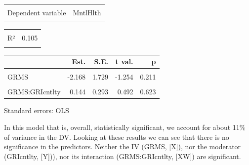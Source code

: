 \documentclass[
  english,
]{book}
\begin{document}
\begin{table}[!h]
\centering
\begin{tabular}{lr}
\toprule
\cellcolor{gray!6}{Observations} & \cellcolor{gray!6}{212}\\
Dependent variable & MntlHlth\\
\cellcolor{gray!6}{Type} & \cellcolor{gray!6}{OLS linear regression}\\
\bottomrule
\end{tabular}
\end{table} \begin{table}[!h]
\centering
\begin{tabular}{lr}
\toprule
\cellcolor{gray!6}{F(3,208)} & \cellcolor{gray!6}{8.137}\\
R² & 0.105\\
\cellcolor{gray!6}{Adj. R²} & \cellcolor{gray!6}{0.092}\\
\bottomrule
\end{tabular}
\end{table} \begin{table}[!h]
\centering
\begin{threeparttable}
\begin{tabular}{lrrrr}
\toprule
  & Est. & S.E. & t val. & p\\
\midrule
\cellcolor{gray!6}{(Intercept)} & \cellcolor{gray!6}{26.647} & \cellcolor{gray!6}{3.877} & \cellcolor{gray!6}{6.873} & \cellcolor{gray!6}{0.000}\\
GRMS & -2.168 & 1.729 & -1.254 & 0.211\\
\cellcolor{gray!6}{GRIcntlty} & \cellcolor{gray!6}{-0.460} & \cellcolor{gray!6}{0.674} & \cellcolor{gray!6}{-0.682} & \cellcolor{gray!6}{0.496}\\
GRMS:GRIcntlty & 0.144 & 0.293 & 0.492 & 0.623\\
\bottomrule
\end{tabular}
\begin{tablenotes}
\item Standard errors: OLS
\end{tablenotes}
\end{threeparttable}
\end{table}

In this model that is, overall, statistically significant, we account for about 11\% of variance in the DV. Looking at these results we can see that there is no significance in the predictors. Neither the IV (GRMS, {[}X{]}), nor the moderator (GRIcntlty, {[}Y{]})), nor its interaction (GRMS:GRIcntlty, {[}XW{]}) are significant.
\end{document}
